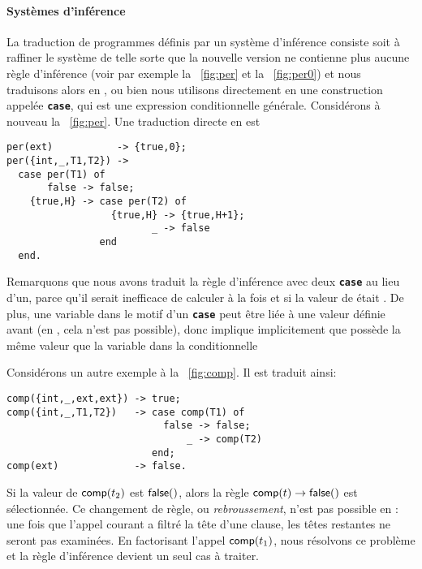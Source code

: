 \paragraph{Systèmes d'inférence}

La traduction de programmes définis par un système d'inférence
consiste soit à raffiner le système de telle sorte que la nouvelle
version ne contienne plus aucune règle d'inférence (voir par exemple
la \fig~\vref{fig:per} et la \fig~\ref{fig:per0}) et nous traduisons
alors en \Erlang, ou bien nous utilisons directement en \Erlang une
construction appelée \texttt{\textbf{case}}, qui est une expression
conditionnelle générale. Considérons à nouveau la
\fig~\vref{fig:per}. Une traduction directe en \Erlang est
\begin{verbatim}
per(ext)           -> {true,0};
per({int,_,T1,T2}) ->
  case per(T1) of
       false -> false;
    {true,H} -> case per(T2) of
                  {true,H} -> {true,H+1};
                         _ -> false
                end
  end.
\end{verbatim}
Remarquons que nous avons traduit la règle d'inférence avec deux
\texttt{\textbf{case}} au lieu d'un, parce qu'il serait inefficace de
calculer à la fois  et  si la valeur
de  était . De plus, une variable dans
le motif d'un \texttt{\textbf{case}} peut être liée à une valeur
définie avant (en \OCaml, cela n'est pas possible), donc  implique implicitement que 
possède la même valeur que la variable  dans la
conditionnelle 

Considérons un autre exemple à la \fig~\vref{fig:comp}. Il est traduit
ainsi:
\begin{verbatim}
comp({int,_,ext,ext}) -> true;
comp({int,_,T1,T2})   -> case comp(T1) of
                           false -> false;
                               _ -> comp(T2)
                         end;
comp(ext)             -> false.
\end{verbatim}
Si la valeur de \(\textsf{comp}(t_2)\) est \(\textsf{false}()\), alors la
règle \(\textsf{comp}(t) \rightarrow \textsf{false}()\) est sélectionnée. Ce
changement de règle, ou \emph{rebroussement}, n'est pas possible en
\Erlang: une fois que l'appel courant a filtré la tête d'une clause,
les têtes restantes ne seront pas examinées. En factorisant l'appel
\(\textsf{comp}(t_1)\), nous résolvons ce problème et la règle
d'inférence devient un seul cas à traiter.

